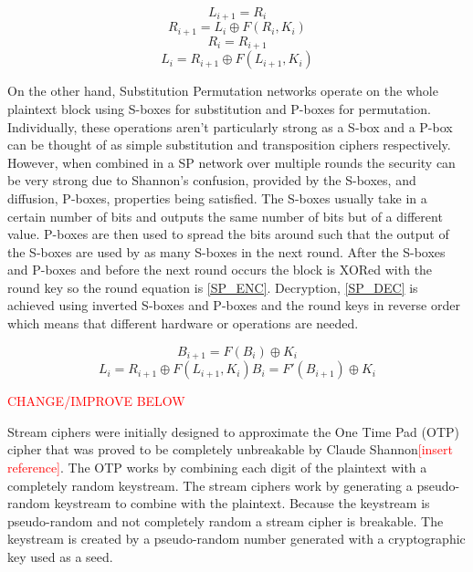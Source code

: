 \documentclass[12pt,twoside,a4paper]{report}
\begin{document}
	\begin{equation}
	\label{F_L_ENC}
	L_{i+1} = R_i
	\end{equation}
	\begin{equation}
	\label{F_R_ENC}
	R_{i+1} = L_i \oplus F(R_i, K_i)
	\end{equation}
	\begin{equation}
	\label{F_L_DEC}
	R_i = R_{i+1}
	\end{equation}
	\begin{equation}
	\label{F_R_DEC}
	L_i = R_{i+1} \oplus F(L_{i+1}, K_i)
	\end{equation}
    
	On the other hand, Substitution Permutation networks operate on the whole plaintext block using S-boxes for substitution and P-boxes for permutation. Individually, these operations aren't particularly strong as a S-box and a P-box can be thought of as simple substitution and transposition ciphers respectively. However, when combined in a SP network over multiple rounds the security can be very strong due to Shannon's confusion, provided by the S-boxes, and diffusion, P-boxes, properties being satisfied\cite{Shannon1949}. The S-boxes usually take in a certain number of bits and outputs the same number of bits but of a different value. P-boxes are then used to spread the bits around such that the output of the S-boxes are used by as many S-boxes in the next round. After the S-boxes and P-boxes and before the next round occurs the block is XORed with the round key so the round equation is \autoref{SP_ENC}. Decryption, \autoref{SP_DEC} is achieved using inverted S-boxes and P-boxes and the round keys in reverse order which means that different hardware or operations are needed.
    
	\begin{equation}
	\label{SP_ENC}
	B_{i+1} = F(B_i) \oplus K_i
	\end{equation}
	\begin{equation}
	\label{SP_DEC}
	L_i = R_{i+1} \oplus F(L_{i+1}, K_i)B_i = F'(B_{i+1}) \oplus K_i
	\end{equation}
    
	\textcolor{red}{CHANGE/IMPROVE BELOW} 
    
	Stream ciphers were initially designed to approximate the One Time Pad (OTP) cipher that was proved to be completely unbreakable by Claude Shannon\textcolor{red}{[insert reference]}. The OTP works by combining each digit of the plaintext with a completely random keystream. The stream ciphers work by generating a pseudo-random keystream to combine with the plaintext\cite{Robshaw1995}. Because the keystream is pseudo-random and not completely random a stream cipher is breakable. The keystream is created by a pseudo-random number generated with a cryptographic key used as a seed.   
    
\end{document}
